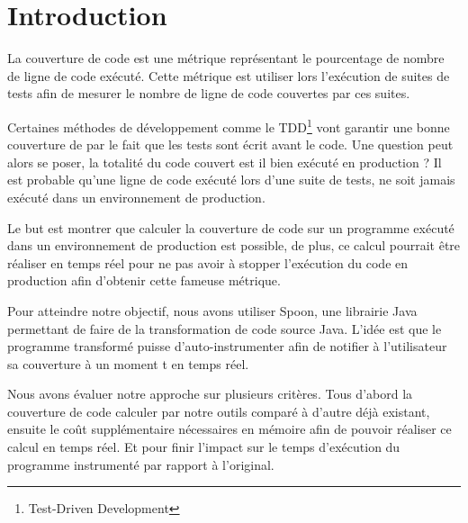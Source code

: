 \chapter*{Introduction}
	\thispagestyle{introduction}

La couverture de code est une métrique représentant le pourcentage de nombre de ligne de code exécuté. Cette métrique est utiliser lors l'exécution de suites de tests afin de mesurer le nombre de ligne de code couvertes par ces suites. 

Certaines méthodes de développement comme le TDD\footnote{Test-Driven Development} vont garantir une bonne couverture de par le fait que les tests sont écrit avant le code. Une question peut alors se poser, la totalité du code couvert est il bien exécuté en production ? Il est probable qu’une ligne de code exécuté lors d’une suite de tests, ne soit jamais exécuté dans un environnement de production. 

Le but est montrer que calculer la couverture de code sur un programme exécuté dans un environnement de production est possible, de plus, ce calcul pourrait être réaliser en temps réel pour ne pas avoir à stopper l’exécution du code en production afin d’obtenir cette fameuse métrique.

Pour atteindre notre objectif, nous avons utiliser Spoon, une librairie Java permettant de faire de la transformation de code source Java. L’idée est que le programme transformé puisse d’auto-instrumenter afin de notifier à l’utilisateur sa couverture à un moment t en temps réel.

Nous avons évaluer notre approche sur plusieurs critères. Tous d’abord la couverture de code calculer par notre outils comparé à d’autre déjà existant, ensuite le coût supplémentaire nécessaires en mémoire afin de pouvoir réaliser ce calcul en temps réel. Et pour finir l’impact sur le temps d’exécution du programme instrumenté par rapport à l’original.

